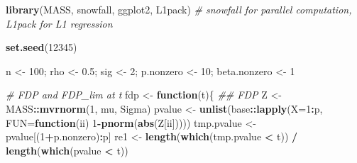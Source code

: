 \documentclass[]{article}
\newenvironment{Shaded}{\begin{snugshade}}{\end{snugshade}}
\newcommand{\CommentTok}[1]{\textcolor[rgb]{0.56,0.35,0.01}{\textit{#1}}}
\newcommand{\ControlFlowTok}[1]{\textcolor[rgb]{0.13,0.29,0.53}{\textbf{#1}}}
\newcommand{\DataTypeTok}[1]{\textcolor[rgb]{0.13,0.29,0.53}{#1}}
\newcommand{\DecValTok}[1]{\textcolor[rgb]{0.00,0.00,0.81}{#1}}
\newcommand{\FloatTok}[1]{\textcolor[rgb]{0.00,0.00,0.81}{#1}}
\newcommand{\KeywordTok}[1]{\textcolor[rgb]{0.13,0.29,0.53}{\textbf{#1}}}
\newcommand{\NormalTok}[1]{#1}
\newcommand{\OperatorTok}[1]{\textcolor[rgb]{0.81,0.36,0.00}{\textbf{#1}}}
\newcommand{\StringTok}[1]{\textcolor[rgb]{0.31,0.60,0.02}{#1}}
\begin{document}
\begin{Shaded}
\begin{Highlighting}[]
\KeywordTok{library}\NormalTok{(MASS, snowfall, ggplot2, L1pack)}
\CommentTok{# snowfall for parallel computation, L1pack for L1 regression}

\KeywordTok{set.seed}\NormalTok{(}\DecValTok{12345}\NormalTok{)}

\NormalTok{n <-}\StringTok{ }\DecValTok{100}\NormalTok{; rho <-}\StringTok{ }\FloatTok{0.5}\NormalTok{; sig <-}\StringTok{ }\DecValTok{2}\NormalTok{; p.nonzero <-}\StringTok{ }\DecValTok{10}\NormalTok{; beta.nonzero <-}\StringTok{ }\DecValTok{1}

\CommentTok{# FDP and FDP_lim at t}
\NormalTok{fdp <-}\StringTok{ }\ControlFlowTok{function}\NormalTok{(t)\{}
  \CommentTok{##  FDP}
\NormalTok{  Z <-}\StringTok{ }\NormalTok{MASS}\OperatorTok{::}\KeywordTok{mvrnorm}\NormalTok{(}\DecValTok{1}\NormalTok{, mu, Sigma)}
\NormalTok{  pvalue <-}\StringTok{ }\KeywordTok{unlist}\NormalTok{(base}\OperatorTok{::}\KeywordTok{lapply}\NormalTok{(}\DataTypeTok{X=}\DecValTok{1}\OperatorTok{:}\NormalTok{p, }\DataTypeTok{FUN=}\ControlFlowTok{function}\NormalTok{(ii) }\DecValTok{1}\OperatorTok{-}\KeywordTok{pnorm}\NormalTok{(}\KeywordTok{abs}\NormalTok{(Z[ii]))))}
\NormalTok{  tmp.pvalue <-}\StringTok{ }\NormalTok{pvalue[(}\DecValTok{1}\OperatorTok{+}\NormalTok{p.nonzero)}\OperatorTok{:}\NormalTok{p]}
\NormalTok{  re1 <-}\StringTok{ }\KeywordTok{length}\NormalTok{(}\KeywordTok{which}\NormalTok{(tmp.pvalue }\OperatorTok{<}\StringTok{ }\NormalTok{t)) }\OperatorTok{/}\StringTok{ }\KeywordTok{length}\NormalTok{(}\KeywordTok{which}\NormalTok{(pvalue }\OperatorTok{<}\StringTok{ }\NormalTok{t))}
  

\end{Highlighting}
\end{Shaded}
\end{document}
